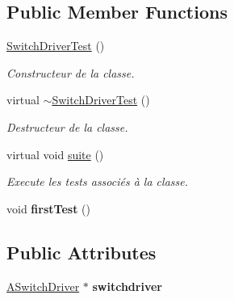 \subsection*{Public Member Functions}
\begin{DoxyCompactItemize}
\item 
\mbox{\label{classtest_1_1SwitchDriverTest_a444ca2c32cc44cc6366f853399265073}} 
\hyperlink{classtest_1_1SwitchDriverTest_a444ca2c32cc44cc6366f853399265073}{Switch\+Driver\+Test} ()
\begin{DoxyCompactList}\small\item\em Constructeur de la classe. \end{DoxyCompactList}\item 
\mbox{\label{classtest_1_1SwitchDriverTest_af00a2a1a821e85ff99369e3caf2f4533}} 
virtual \hyperlink{classtest_1_1SwitchDriverTest_af00a2a1a821e85ff99369e3caf2f4533}{$\sim$\+Switch\+Driver\+Test} ()
\begin{DoxyCompactList}\small\item\em Destructeur de la classe. \end{DoxyCompactList}\item 
\mbox{\label{classtest_1_1SwitchDriverTest_ad1e3f5cc9fddedbce544a0986feeda06}} 
virtual void \hyperlink{classtest_1_1SwitchDriverTest_ad1e3f5cc9fddedbce544a0986feeda06}{suite} ()
\begin{DoxyCompactList}\small\item\em Execute les tests associés à la classe. \end{DoxyCompactList}\item 
\mbox{\label{classtest_1_1SwitchDriverTest_ace3316f253b4680244953130d9ca9cc5}} 
void {\bfseries first\+Test} ()
\end{DoxyCompactItemize}
\subsection*{Public Attributes}
\begin{DoxyCompactItemize}
\item 
\mbox{\label{classtest_1_1SwitchDriverTest_a6bba05c353ced5fec7c8c1ba0e76976f}} 
\hyperlink{classASwitchDriver}{A\+Switch\+Driver} $\ast$ {\bfseries switchdriver}
\end{DoxyCompactItemize}
